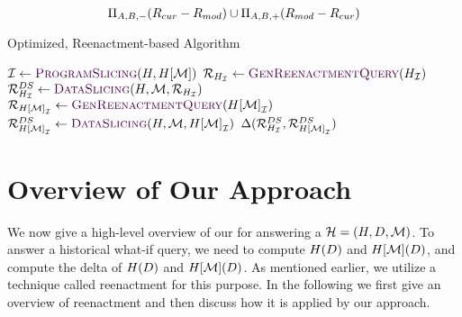 \[
  \Pi_{A,B,-}(R_{cur} - R_{mod}) \cup   \Pi_{A,B,+}(R_{mod} - R_{cur})
\]


\begin{algorithm}[t]
  \caption{Optimized, Reenactment-based \abbrHW Algorithm}
  \label{alg:whatif-algo}
  \begin{algorithmic}[1]
    \State $\idxs \gets \Call{ProgramSlicing}{\history,\ahmod}$  \label{alg-line:opt-ps}
    \State $\ract{\hslice{\history}{\idxs}} \gets \Call{GenReenactmentQuery}{\hslice{\history}{\idxs}}$ \label{alg-line:opt-h-renact}
    \State $\ract{\hslice{\history}{\idxs}}^{DS} \gets \Call{DataSlicing}{\history,\deltaHist,\ract{\hslice{\history}{\idxs}}}$ \label{alg-line:opt-h-ds}
    \State $\ract{\hslice{\ahmod}{\idxs}} \gets \Call{GenReenactmentQuery}{\hslice{\ahmod}{\idxs}}$ \label{alg-line:opt-m-renact}
    \State $\ract{\hslice{\ahmod}{\idxs}}^{DS} \gets \Call{DataSlicing}{\history,\deltaHist,\hslice{\ahmod}{\idxs}}$ \label{alg-line:opt-m-ds}
    \State \Return $\Delta(\mathcal{R}_{{H}_{\mathcal{I}}}^{DS},\mathcal{R}_{{H[\mathcal{M}]}_{\mathcal{I}}}^{DS})$ \label{alg-line:opt-diff}
    \EndProcedure
  \end{algorithmic}
\end{algorithm}

\section{Overview of Our Approach}
\label{sec:overview}


We now give a high-level overview of our  for answering a \abbrHW $\mathcal{H} = (H, D, \mathcal{M})$.  %
To answer a historical what-if query, we need to compute $H(D)$ and $H[\mathcal{M}](D)$, and compute the delta of $H(D)$ and $H[\mathcal{M}](D)$. As mentioned earlier, we utilize a technique called reenactment for this purpose. In the following we first give an overview of reenactment and then discuss how it is applied by our approach. %


